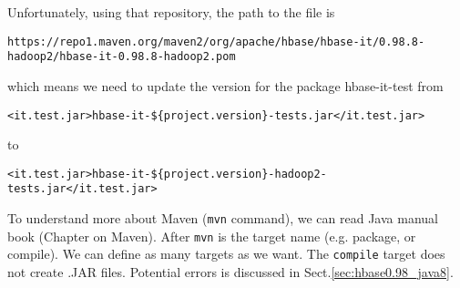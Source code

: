 Unfortunately, using that repository, the path to the file is
\begin{verbatim}
https://repo1.maven.org/maven2/org/apache/hbase/hbase-it/0.98.8-hadoop2/hbase-it-0.98.8-hadoop2.pom
\end{verbatim}
which means we need to update the version for the package hbase-it-test from
\begin{verbatim}
<it.test.jar>hbase-it-${project.version}-tests.jar</it.test.jar> 
\end{verbatim}
to 
\begin{verbatim}
<it.test.jar>hbase-it-${project.version}-hadoop2-tests.jar</it.test.jar> 
\end{verbatim}


\begin{mdframed}
To understand more about Maven (\verb!mvn! command), we can read Java manual
book (Chapter on Maven). After \verb!mvn! is the target name (e.g. package, or
compile). We can define as many targets as we want. The \verb!compile! target
does not create .JAR files.
Potential errors is discussed in Sect.\ref{sec:hbase0.98_java8}.

\end{mdframed}

